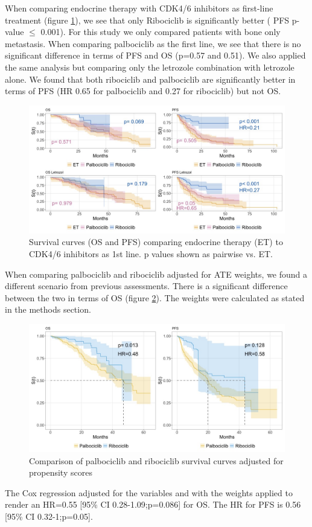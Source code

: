 When comparing endocrine therapy with CDK4/6 inhibitors as first-line treatment (figure \ref*{fig:grouped}), we see that only Ribociclib is significantly better ( PFS p-value $\le$ 0.001). For this study we only compared patients with bone only metastasis. When comparing palbociclib as the first line, we see that there is no significant difference in terms of PFS and OS (p=0.57 and 0.51). We also applied the same analysis but comparing only the letrozole combination with letrozole alone. We found that both ribociclib and palbociclib are significantly better in terms of PFS (HR 0.65 for palbociclib and 0.27 for ribociclib) but not OS.
\begin{figure}[ht]
  \centering

  \caption{Survival curves (OS and PFS) comparing endocrine therapy (ET) to CDK4/6 inhibitors as 1st line. p values shown as pairwise vs. ET. }\label{fig:grouped} 
  \includegraphics[scale=0.42]{figures/grouped_curve_both.jpeg}%

\end{figure}

When comparing palbociclib and ribociclib adjusted for ATE weights, we found a different scenario from previous assessments. There is a significant difference between the two in terms of OS  (figure \ref*{fig:propensity}). The weights were calculated as stated in the methods section.

\begin{figure}[ht]
  \centering

  \caption{Comparison of palbociclib and ribociclib survival curves adjusted for propensity scores  }\label{fig:propensity} 
  \includegraphics[scale=0.38]{figures/propensity_score_both.jpeg}%

\end{figure}

The Cox regression adjusted for the variables and with the weights applied to render an HR=0.55 [95\% CI 0.28-1.09;p=0.086] for OS. The HR for PFS is 0.56 [95\% CI 0.32-1;p=0.05].